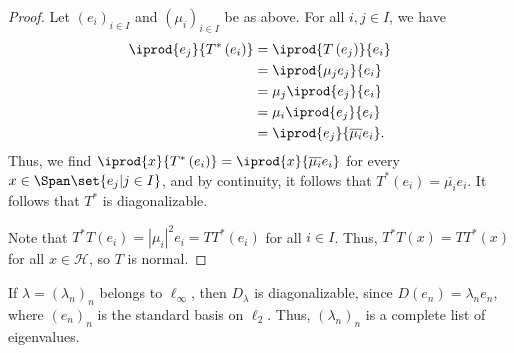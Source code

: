 \documentclass[10pt]{mypackage}
\begin{document}
\begin{proof}
  Let $\left(e_i\right)_{i\in I}$ and $\left(\mu_i\right)_{i\in I}$ be as above. For all $i,j\in I$, we have
  \begin{align*}
    \iprod{e_j}{T^{\ast}\left(e_i\right)} &= \iprod{T\left(e_j\right)}{e_i}\\
                                          &= \iprod{\mu_je_j}{e_i}\\
                                          &= \mu_j \iprod{e_j}{e_i}\\
                                          &= \mu_i \iprod{e_j}{e_i}\\
                                          &= \iprod{e_j}{\overline{\mu_i}e_i}.
  \end{align*}
  Thus, we find $ \iprod{x}{T^{\ast}\left(e_i\right)} = \iprod{x}{\overline{\mu_i}e_i} $ for every $x\in \Span\set{e_j|j\in I}$, and by continuity, it follows that $T^{\ast}\left(e_i\right) = \overline{\mu_i}e_i$. It follows that $T^{\ast}$ is diagonalizable.\newline

  Note that $T^{\ast}T\left(e_i\right) = \left\vert \mu_i \right\vert^2e_i = TT^{\ast}\left(e_i\right)$ for all $i\in I$. Thus, $T^{\ast}T\left(x\right) = TT^{\ast}\left(x\right)$ for all $x\in \mathcal{H}$, so $T$ is normal.
\end{proof}
\begin{example}
  If $\lambda = \left(\lambda_n\right)_n$ belongs to $\ell_{\infty}$, then $D_{\lambda}$ is diagonalizable, since $D\left(e_n\right) = \lambda_ne_n$, where $\left(e_n\right)_n$ is the standard basis on $\ell_2$. Thus, $\left(\lambda_n\right)_n$ is a complete list of eigenvalues.
\end{example}
\end{document}
